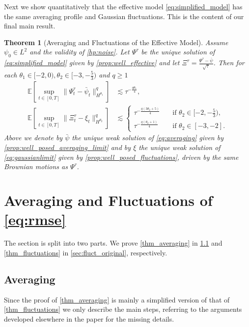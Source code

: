 \documentclass[a4paper,10pt]{amsart}
\newtheorem{theorem}{Theorem}[section]
\theoremstyle{remark}
\numberwithin{equation}{section}
\begin{document}
Next we show quantitatively that the effective model
\eqref{eq:simplified_model} has the same averaging profile and Gaussian
fluctuations. This is the content of our final main result.
\begin{theorem}[Averaging and Fluctuations of the Effective Model]\label{thm_effective_model}
 Assume $\psi_0\in L^2$ and the validity of \cref{hp:noise}. Let $\Psi^{\tau}$ be the unique solution of \eqref{eq:simplified_model} given by \autoref{prop:well_effective} and let  $\Xi^{\tau}=\frac{\Psi^\tau-\bar{\psi}}{\sqrt{\tau}}$. Then for each $\theta_1\in [-2,0),\theta_2\in [-3,-\frac{5}{3})$ and $q\geq 1$
 \begin{align}\label{eq_rate_averaging}
     \mathbb{E}\left[\sup_{t\in [0,T]}\|\Psi_t^{\tau}-\bar{\psi}_t\|_{H^{\theta_1}}^q\right]&\lesssim \tau^{-\frac{q\theta_1}{4}},\\
     \mathbb{E}\left[\sup_{t\in [0,T]}\|\Xi_t^{\tau}-\xi_t\|_{H^{\theta_2}}^q\right]&\lesssim \begin{cases}\tau^{-\frac{q(3\theta_2+5)}{4}}\quad &\text{if }\theta_2\in [-2,-\frac{5}{3}),\\
        \tau^{-\frac{q(\theta_2+1)}{4}}\quad &\text{if }\theta_2\in [-3,-2].
     \end{cases}\label{eq_rate_fluctuctions}
 \end{align}
 Above we denote by $\bar{\psi}$ the unique weak solution of \eqref{eq:averaging} given by \cref{prop:well_posed_averaging_limit} and by $\xi$ the unique weak solution of \eqref{eq:gaussianlimit} given by \cref{prop:well_posed_fluctuations}, driven by the same Brownian motions as $\Psi^\tau$.
\end{theorem}


\section{Averaging and Fluctuations of \texorpdfstring{\eqref{eq:rmse}}{(RMSE)} }\label{sec:proof_main_original}
The section is split into two parts. We prove \cref{thm_averaging} in
\cref{sec:averaging} and \cref{thm_fluctuations} in
\cref{sec:fluct_original}, respectively.
\subsection{Averaging}\label{sec:averaging}
Since the proof of \cref{thm_averaging} is mainly a simplified version of that of \cref{thm_fluctuations} we only describe the main steps, referring to the arguments developed elsewhere in the paper for the missing details.
\end{document}
